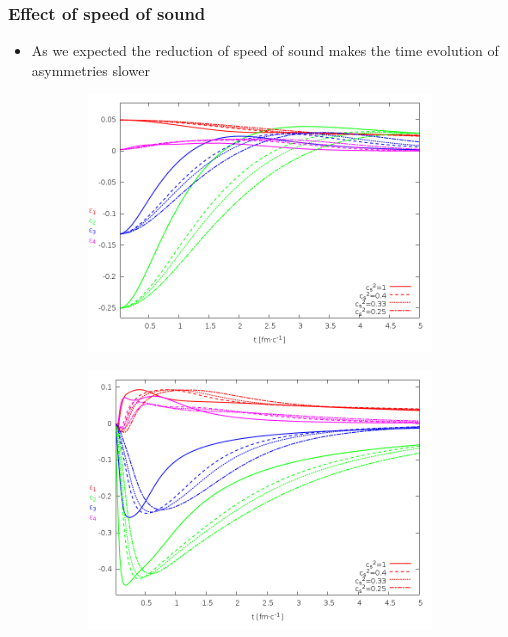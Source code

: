 \documentclass{beamer}
\begin{document}
\begin{frame}
\frametitle{Effect of speed of sound}
\begin{center}
\begin{itemize}
\item As we expected the reduction of speed of sound makes the time evolution of asymmetries slower
\end{itemize}
\begin{figure}[H]
	\centering
    \begin{subfigure}[b]{0.49\textwidth}
    		\includegraphics[width=\textwidth]{pic/res/nonrel/eps_cs2_r}
	\end{subfigure}
	\begin{subfigure}[b]{0.49\textwidth}
        	\includegraphics[width=\textwidth]{pic/res/nonrel/eps_cs2_v}
	\end{subfigure}
\end{figure}
\end{center}
\end{frame}
\end{document}

